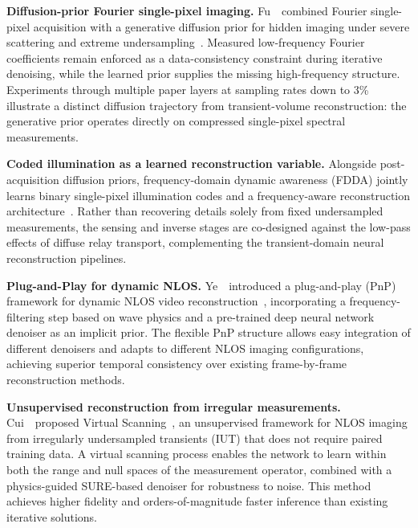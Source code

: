 \vspace{0.8mm}
\noindent \textbf{Diffusion-prior Fourier single-pixel imaging.}
Fu~\etal~combined Fourier single-pixel acquisition with a generative diffusion prior for hidden imaging under severe scattering and extreme undersampling~\cite{fuFourierSinglePixelDiffusion2026}. Measured low-frequency Fourier coefficients remain enforced as a data-consistency constraint during iterative denoising, while the learned prior supplies the missing high-frequency structure. Experiments through multiple paper layers at sampling rates down to 3\% illustrate a distinct diffusion trajectory from transient-volume reconstruction: the generative prior operates directly on compressed single-pixel spectral measurements.

\vspace{0.8mm}
\noindent \textbf{Coded illumination as a learned reconstruction variable.}
Alongside post-acquisition diffusion priors, frequency-domain dynamic awareness (FDDA) jointly learns binary single-pixel illumination codes and a frequency-aware reconstruction architecture~\cite{yangFDDASinglePixelNLOS2026}. Rather than recovering details solely from fixed undersampled measurements, the sensing and inverse stages are co-designed against the low-pass effects of diffuse relay transport, complementing the transient-domain neural reconstruction pipelines.

\vspace{0.8mm}
\noindent \textbf{Plug-and-Play for dynamic NLOS.}
Ye~\etal~introduced a plug-and-play (PnP) framework for dynamic NLOS video reconstruction~\cite{yePnPDynamic2024}, incorporating a frequency-filtering step based on wave physics and a pre-trained deep neural network denoiser as an implicit prior. The flexible PnP structure allows easy integration of different denoisers and adapts to different NLOS imaging configurations, achieving superior temporal consistency over existing frame-by-frame reconstruction methods.

\vspace{0.8mm}
\noindent \textbf{Unsupervised reconstruction from irregular measurements.}
Cui~\etal~proposed Virtual Scanning~\cite{cuiVirtualScanning2024}, an unsupervised framework for NLOS imaging from irregularly undersampled transients (IUT) that does not require paired training data. A virtual scanning process enables the network to learn within both the range and null spaces of the measurement operator, combined with a physics-guided SURE-based denoiser for robustness to noise. This method achieves higher fidelity and orders-of-magnitude faster inference than existing iterative solutions.


